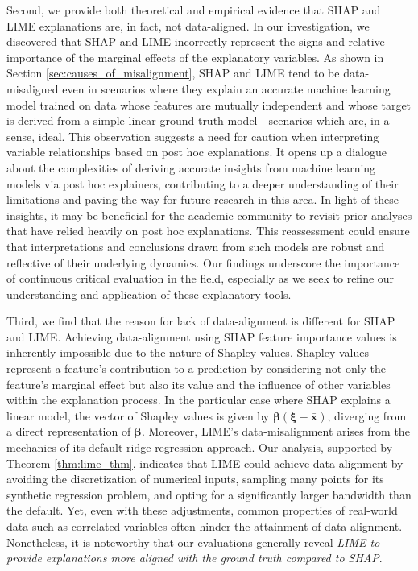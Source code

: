 \documentclass[mnsc,blindrev]{informs3}
\begin{document}
       Second, we provide both theoretical and empirical evidence that SHAP and LIME explanations are, in fact, not data-aligned. In our investigation, we discovered that SHAP and LIME incorrectly represent the signs and relative importance of the marginal effects of the explanatory variables. As shown in Section \ref{sec:causes_of_misalignment}, SHAP and LIME tend to be data-misaligned even in scenarios where they explain an accurate machine learning model trained on data whose features are mutually independent and whose target is derived from a simple linear ground truth model - scenarios which are, in a sense, ideal. This observation suggests a need for caution when interpreting variable relationships based on post hoc explanations. It opens up a dialogue about the complexities of deriving accurate insights from machine learning models via post hoc explainers, contributing to a deeper understanding of their limitations and paving the way for future research in this area. In light of these insights, it may be beneficial for the academic community to revisit prior analyses that have relied heavily on post hoc explanations. This reassessment could ensure that interpretations and conclusions drawn from such models are robust and reflective of their underlying dynamics. Our findings underscore the importance of continuous critical evaluation in the field, especially as we seek to refine our understanding and application of these explanatory tools. 
        
        Third, we find that the reason for lack of data-alignment is different for SHAP and LIME. Achieving data-alignment using SHAP feature importance values is inherently impossible due to the nature of Shapley values. Shapley values represent a feature's contribution to a prediction by considering not only the feature's marginal effect but also its value and the influence of other variables within the explanation process. In the particular case where SHAP explains a linear model, the vector of Shapley values is given by $\boldsymbol{\beta}(\boldsymbol{\xi}-\bar{\mathbf{x}})$, diverging from a direct representation of $\boldsymbol{\beta}$. Moreover, LIME's data-misalignment arises from the mechanics of its default ridge regression approach. Our analysis, supported by Theorem \ref{thm:lime_thm}, indicates that LIME could achieve data-alignment by avoiding the discretization of numerical inputs, sampling many points for its synthetic regression problem, and opting for a significantly larger bandwidth than the default. Yet, even with these adjustments, common properties of real-world data such as correlated variables often hinder the attainment of data-alignment. Nonetheless, it is noteworthy that our evaluations generally reveal \textit{LIME to provide explanations more aligned with the ground truth compared to SHAP}.
 
\end{document}
